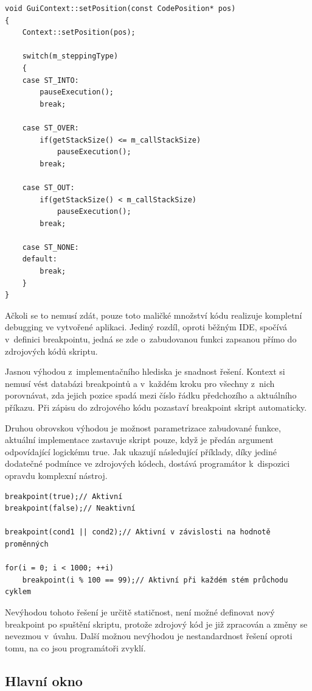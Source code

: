\documentclass[11pt,twoside,a4paper]{book}
\begin{document}
\begin{verbatim}
void GuiContext::setPosition(const CodePosition* pos)
{
    Context::setPosition(pos);

    switch(m_steppingType)
    {
    case ST_INTO:
        pauseExecution();
        break;

    case ST_OVER:
        if(getStackSize() <= m_callStackSize)
            pauseExecution();
        break;

    case ST_OUT:
        if(getStackSize() < m_callStackSize)
            pauseExecution();
        break;

    case ST_NONE:
    default:
        break;
    }
}
\end{verbatim}

Ačkoli se to nemusí zdát, pouze toto maličké množství kódu realizuje kompletní debugging ve vytvořené aplikaci. Jediný rozdíl, oproti běžným IDE, spočívá v~definici breakpointu, jedná se zde o~zabudovanou funkci zapsanou přímo do zdrojových kódů skriptu.

Jasnou výhodou z~implementačního hlediska je snadnost řešení. Kontext si nemusí vést databázi breakpointů a v~každém kroku pro všechny z~nich porovnávat, zda jejich pozice spadá mezi číslo řádku předchozího a aktuálního příkazu. Při zápisu do zdrojového kódu pozastaví breakpoint skript automaticky.

Druhou obrovskou výhodou je možnost parametrizace zabudované funkce, aktuální implementace zastavuje skript pouze, když je předán argument odpovídající logickému true. Jak ukazují následující příklady, díky jediné dodatečné podmínce ve zdrojových kódech, dostává programátor k~dispozici opravdu komplexní nástroj.

\begin{verbatim}
breakpoint(true);// Aktivní
breakpoint(false);// Neaktivní

breakpoint(cond1 || cond2);// Aktivní v závislosti na hodnotě proměnných

for(i = 0; i < 1000; ++i)
    breakpoint(i % 100 == 99);// Aktivní při každém stém průchodu cyklem
\end{verbatim}

Nevýhodou tohoto řešení je určitě statičnost, není možné definovat nový breakpoint po spuštění skriptu, protože zdrojový kód je již zpracován a změny se nevezmou v~úvahu. Další možnou ne\-vý\-ho\-dou je nestandardnost řešení oproti tomu, na co jsou programátoři zvyklí.


\subsection{Hlavní okno}
\end{document}
